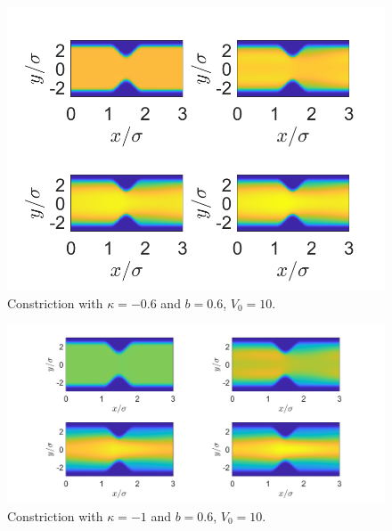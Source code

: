 \documentclass[11pt, a4paper]{article}
\theoremstyle{definition}
\begin{document}
\begin{figure}[h]
	\centering
	\includegraphics[scale=0.6]{Con3.png}
	\caption{Constriction with $\kappa = -0.6$ and $b = 0.6$, $V_0 = 10$.} 
	\label{F4}
\end{figure}


\begin{figure}[h]
	\centering
	\includegraphics[scale=0.3]{Con4.png}
	\caption{Constriction with $\kappa = -1$ and $b = 0.6$, $V_0 = 10$.} 
	\label{F5}
\end{figure}
\end{document}

